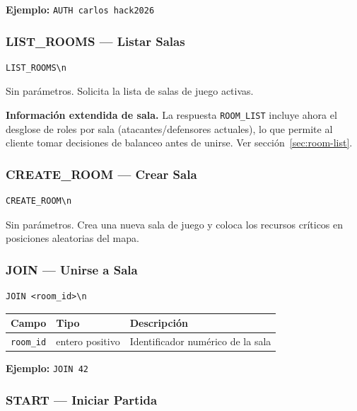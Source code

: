 \documentclass[12pt, letterpaper]{article}
\begin{document}
\textbf{Ejemplo:} \texttt{AUTH carlos hack2026}

\subsubsection{LIST\_ROOMS --- Listar Salas}

\begin{lstlisting}
LIST_ROOMS\n
\end{lstlisting}

Sin parámetros. Solicita la lista de salas de juego activas.

\begin{nota}
\textbf{Información extendida de sala.} La respuesta \texttt{ROOM\_LIST} incluye ahora
el desglose de roles por sala (atacantes/defensores actuales), lo que permite al cliente
tomar decisiones de balanceo antes de unirse. Ver sección~\ref{sec:room-list}.
\end{nota}

\subsubsection{CREATE\_ROOM --- Crear Sala}

\begin{lstlisting}
CREATE_ROOM\n
\end{lstlisting}

Sin parámetros. Crea una nueva sala de juego y coloca los recursos críticos en posiciones aleatorias del mapa.

\subsubsection{JOIN --- Unirse a Sala}

\begin{lstlisting}
JOIN <room_id>\n
\end{lstlisting}

\begin{table}[H]
\centering
\begin{tabularx}{\textwidth}{l l X}
\toprule
\textbf{Campo} & \textbf{Tipo} & \textbf{Descripción} \\
\midrule
\texttt{room\_id} & entero positivo & Identificador numérico de la sala \\
\bottomrule
\end{tabularx}
\end{table}

\textbf{Ejemplo:} \texttt{JOIN 42}

\subsubsection{START --- Iniciar Partida}
\end{document}
